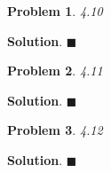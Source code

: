 \documentclass[12pt]{article}
\newtheorem{p}{Problem}
\theoremstyle{definition}
\newenvironment{s}{%
        \begin{trivlist} \item \textbf{Solution}. }{%
            \hspace*{\fill} $\blacksquare$\end{trivlist}}%
\begin{document}
{\begin{p}
4.10
\end{p}

\begin{s}
\end{s}


\begin{p}
4.11
\end{p}

\begin{s}
\end{s}

\begin{p}
4.12
\end{p}

\begin{s}
\end{s}
\end{document}
